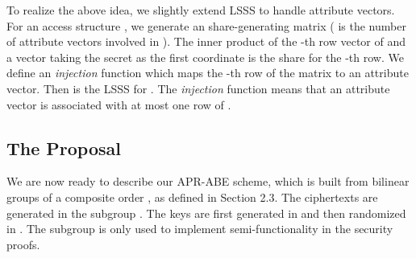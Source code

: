 \documentclass[twocolumn]{svjour3}          \smartqed  \usepackage{graphicx}
\begin{document}
To realize the above idea, we slightly extend LSSS to handle attribute vectors. For an access structure , we generate an 
share-generating matrix  ( is the number of attribute vectors involved in ). The inner product of the
-th row vector of  and a vector taking the secret as the first coordinate is the share for the -th row. We define an {\em injection} function 
which maps the -th row of the matrix  to an attribute vector. Then  is the LSSS for . The {\em injection}
function means that an attribute vector is associated with at most one row of .

\subsection{The Proposal}

We are now ready to describe our APR-ABE scheme, which is built from bilinear groups of a composite order , as defined in Section 2.3. The
ciphertexts are generated in the subgroup . The keys are first generated in  and then randomized in . The
subgroup  is only used to implement semi-functionality in the security proofs.
\end{document}
